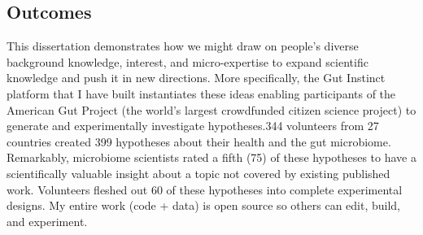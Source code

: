 
\subsection{Outcomes}


This dissertation demonstrates how we might draw on people’s diverse background knowledge, interest, and micro-expertise to expand scientific knowledge and push it in new directions. More specifically, the Gut Instinct platform that I have built instantiates these ideas enabling participants of the American Gut Project (the world’s largest crowdfunded citizen science project) to generate and experimentally investigate hypotheses.344 volunteers from 27 countries created 399 hypotheses about their health and the gut microbiome. Remarkably, microbiome scientists rated a fifth (75) of these hypotheses to have a scientifically valuable insight about a topic not covered by existing published work. Volunteers fleshed out 60 of these hypotheses into complete experimental designs. My entire work (code + data) is open source so others can edit, build, and experiment.

